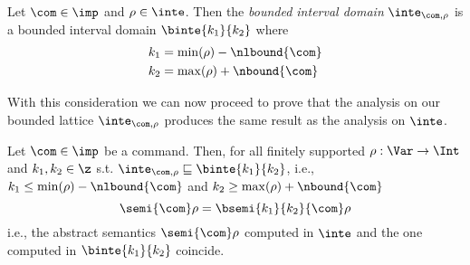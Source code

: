 \begin{definition}\label{def:boundedbycom}
  Let \(\com\in\imp\) and \(\rho \in \inte\). Then the \emph{bounded
    interval domain} \(\inte_{\com,\rho}\) is a bounded interval
  domain \(\binte{k_1}{k_2}\) where
  \begin{align*}
    k_1 & = \min(\rho) - \nlbound{\com} \\
    k_2 & = \max(\rho) + \nbound{\com}
  \end{align*}
\end{definition}

With this consideration we can now proceed to prove that the analysis
on our bounded lattice \(\inte_{\com,\rho}\) produces the same result
as the analysis on \(\inte\).


\begin{theorem}\label{th:bounded}
  Let \(\com\in \imp\) be a command. Then, for all finitely supported
  \(\rho : \Var \to \Int\) and \(k_1, k_2\in \z\) s.t.
  \(\inte_{\com,\rho} \sqsubseteq \binte{k_1}{k_2}\), i.e.,
  \(k_1 \leq \min(\rho) - \nlbound{\com}\) and
  \(k_2 \geq \max(\rho) + \nbound{\com}\)
  \begin{equation}\label{eq:equal}
    \semi{\com}\rho = \bsemi{k_1}{k_2}{\com}\rho
  \end{equation}
  i.e., the abstract semantics \(\semi{\com} \rho\)
  computed in \(\inte\) and the one computed in \(\binte{k_1}{k_2}\)
  coincide.
\end{theorem}

